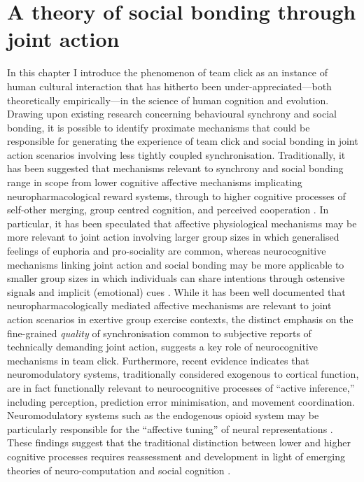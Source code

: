 \section{A theory of social bonding through joint action}
In this chapter I introduce the phenomenon of team click as an instance of human cultural interaction that has hitherto been under-appreciated---both theoretically  empirically---in the science of human cognition and evolution.  Drawing upon existing research concerning behavioural synchrony and social bonding, it is possible to identify proximate mechanisms that could be responsible for generating the experience of team click and social bonding in joint action scenarios involving less tightly coupled synchronisation.
Traditionally, it has been suggested that mechanisms relevant to synchrony and social bonding range in scope from lower cognitive affective mechanisms implicating neuropharmacological reward systems, through to higher cognitive processes of self-other merging, group centred cognition, and perceived cooperation \citep{Mogan2017}. In particular, it has been speculated that affective physiological mechanisms may be more relevant to joint action involving larger group sizes in which generalised feelings of euphoria and pro-sociality are common, whereas neurocognitive mechanisms linking joint action and social bonding may be more applicable to smaller group sizes in which individuals can share intentions through ostensive signals and implicit (emotional) cues \citep{Semin2008,Frith2010}.
While it has been well documented that neuropharmacologically mediated affective mechanisms are relevant to joint action scenarios in exertive group exercise contexts\citep{Cohen2009,Sullivan2013,Tarr2015}, the distinct emphasis on the fine-grained \textit{quality} of synchronisation common to subjective reports of technically demanding joint action, suggests a key role of neurocognitive mechanisms in team click.
Furthermore, recent evidence indicates that neuromodulatory systems, traditionally considered exogenous to cortical function, are in fact functionally relevant to neurocognitive processes of ``active inference,'' including perception, prediction error minimisation, and movement coordination\citep{Pessoa2013,Krahe2013,Buchel2014,Miller2017}.  Neuromodulatory systems such as the endogenous opioid system may be particularly responsible for the ``affective tuning'' of neural representations \citep{Panksepp1998,Pessoa2013}. These findings suggest that the traditional distinction between lower and higher cognitive processes requires reassessment and development in light of emerging theories of neuro-computation and social cognition \citep{Pessoa2013,Clark2013}.

